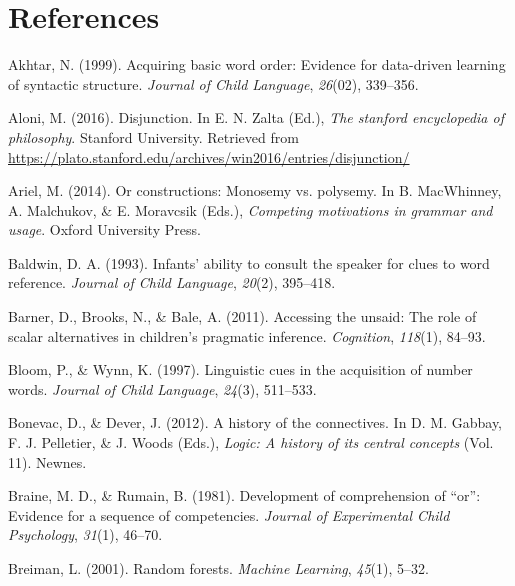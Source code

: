 \documentclass[oneside]{report}
\theoremstyle{definition}
\theoremstyle{definition}
\theoremstyle{definition}
\theoremstyle{remark}
\begin{document}
\chapter*{References}\label{references}


\noindent

\setlength{\parindent}{-0.20in} \setlength{\leftskip}{0.20in}
\setlength{\parskip}{8pt}

\hypertarget{refs}{}
\hypertarget{ref-akhtar1999acquiring}{}
Akhtar, N. (1999). Acquiring basic word order: Evidence for data-driven
learning of syntactic structure. \emph{Journal of Child Language},
\emph{26}(02), 339--356.

\hypertarget{ref-Aloni2016}{}
Aloni, M. (2016). Disjunction. In E. N. Zalta (Ed.), \emph{The stanford
encyclopedia of philosophy}. Stanford University. Retrieved from
\url{https://plato.stanford.edu/archives/win2016/entries/disjunction/}

\hypertarget{ref-Ariel2014}{}
Ariel, M. (2014). Or constructions: Monosemy vs. polysemy. In B.
MacWhinney, A. Malchukov, \& E. Moravcsik (Eds.), \emph{Competing
motivations in grammar and usage}. Oxford University Press.

\hypertarget{ref-baldwin1993infants}{}
Baldwin, D. A. (1993). Infants' ability to consult the speaker for clues
to word reference. \emph{Journal of Child Language}, \emph{20}(2),
395--418.

\hypertarget{ref-barner2011accessing}{}
Barner, D., Brooks, N., \& Bale, A. (2011). Accessing the unsaid: The
role of scalar alternatives in children's pragmatic inference.
\emph{Cognition}, \emph{118}(1), 84--93.

\hypertarget{ref-bloom1997linguistic}{}
Bloom, P., \& Wynn, K. (1997). Linguistic cues in the acquisition of
number words. \emph{Journal of Child Language}, \emph{24}(3), 511--533.

\hypertarget{ref-gabbay2012logic}{}
Bonevac, D., \& Dever, J. (2012). A history of the connectives. In D. M.
Gabbay, F. J. Pelletier, \& J. Woods (Eds.), \emph{Logic: A history of
its central concepts} (Vol. 11). Newnes.

\hypertarget{ref-braine1981development}{}
Braine, M. D., \& Rumain, B. (1981). Development of comprehension of
``or'': Evidence for a sequence of competencies. \emph{Journal of
Experimental Child Psychology}, \emph{31}(1), 46--70.

\hypertarget{ref-breiman2001random}{}
Breiman, L. (2001). Random forests. \emph{Machine Learning},
\emph{45}(1), 5--32.
\end{document}
